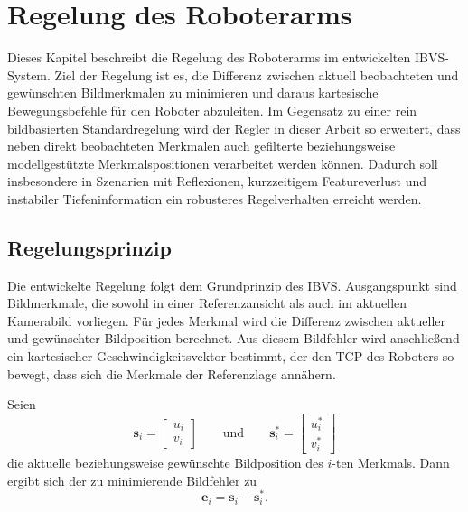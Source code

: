 \chapter{Regelung des Roboterarms}
\label{chap:regelung_roboterarm}

Dieses Kapitel beschreibt die Regelung des Roboterarms im entwickelten \ac{IBVS}-System. Ziel der Regelung ist es, die Differenz zwischen aktuell beobachteten und gewünschten Bildmerkmalen zu minimieren und daraus kartesische Bewegungsbefehle für den Roboter abzuleiten. Im Gegensatz zu einer rein bildbasierten Standardregelung wird der Regler in dieser Arbeit so erweitert, dass neben direkt beobachteten Merkmalen auch gefilterte beziehungsweise modellgestützte Merkmalspositionen verarbeitet werden können. Dadurch soll insbesondere in Szenarien mit Reflexionen, kurzzeitigem Featureverlust und instabiler Tiefeninformation ein robusteres Regelverhalten erreicht werden.

\section{Regelungsprinzip}
\label{sec:regelungsprinzip}

Die entwickelte Regelung folgt dem Grundprinzip des \ac{IBVS}. Ausgangspunkt sind Bildmerkmale, die sowohl in einer Referenzansicht als auch im aktuellen Kamerabild vorliegen. Für jedes Merkmal wird die Differenz zwischen aktueller und gewünschter Bildposition berechnet. Aus diesem Bildfehler wird anschließend ein kartesischer Geschwindigkeitsvektor bestimmt, der den \ac{TCP} des Roboters so bewegt, dass sich die Merkmale der Referenzlage annähern.

Seien
\begin{equation}
\mathbf{s}_i =
\begin{bmatrix}
u_i \\ v_i
\end{bmatrix}
\qquad \text{und} \qquad
\mathbf{s}_i^\ast =
\begin{bmatrix}
u_i^\ast \\ v_i^\ast
\end{bmatrix}
\end{equation}
die aktuelle beziehungsweise gewünschte Bildposition des \(i\)-ten Merkmals. Dann ergibt sich der zu minimierende Bildfehler zu
\begin{equation}
\mathbf{e}_i = \mathbf{s}_i - \mathbf{s}_i^\ast.
\end{equation}


